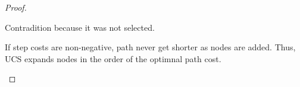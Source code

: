 \begin{listo}
\begin{solution}
\begin{proof}
\begin{listu}
                Contradition because it was not selected. 

                \item If step costs are non-negative, path never get shorter as nodes are added. Thus, UCS expands nodes in the order of the optimnal path cost. 
            \end{listu}
        \end{proof}
    \end{solution}
\end{listo}